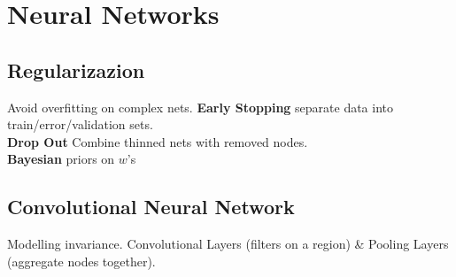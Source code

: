 \section*{Neural Networks}

\subsection*{Regularizazion}
Avoid overfitting on complex nets.
\textbf{Early Stopping} separate data into train/error/validation sets.\\
\textbf{Drop Out} Combine thinned nets with removed nodes.\\
\textbf{Bayesian} priors on $w$'s

\subsection*{Convolutional Neural Network}
Modelling invariance.
Convolutional Layers (filters on a region) \& Pooling Layers (aggregate nodes together).

